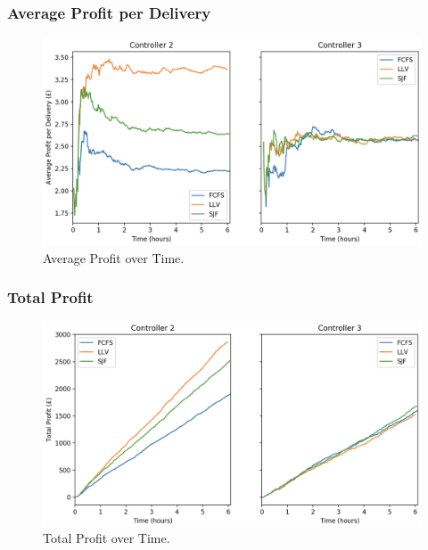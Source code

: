 \documentclass[a4paper,11pt,titlepage]{report}
\begin{document}
\clearpage
\subsubsection{Average Profit per Delivery}
\begin{figure}[!hbpt]
  \center
  \includegraphics[width=\linewidth]{img/small/avgprofit.png}
  \caption{Average Profit over Time.}
  \label{fig:small_avgprofit}
\end{figure}

\subsubsection{Total Profit}
\begin{figure}[!hbpt]
  \center
  \includegraphics[width=\linewidth]{img/small/profit.png}
  \caption{Total Profit over Time.}
  \label{fig:small_profit}
\end{figure}

\clearpage
\end{document}
